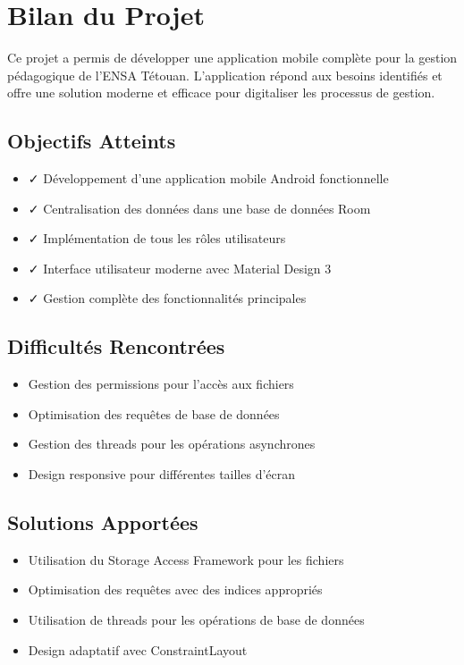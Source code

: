 \documentclass[12pt,a4paper]{report}
\begin{document}
\section{Bilan du Projet}

Ce projet a permis de développer une application mobile complète pour la gestion pédagogique de l'ENSA Tétouan. L'application répond aux besoins identifiés et offre une solution moderne et efficace pour digitaliser les processus de gestion.

\subsection{Objectifs Atteints}

\begin{itemize}
    \item ✓ Développement d'une application mobile Android fonctionnelle
    \item ✓ Centralisation des données dans une base de données Room
    \item ✓ Implémentation de tous les rôles utilisateurs
    \item ✓ Interface utilisateur moderne avec Material Design 3
    \item ✓ Gestion complète des fonctionnalités principales
\end{itemize}

\subsection{Difficultés Rencontrées}

\begin{itemize}
    \item Gestion des permissions pour l'accès aux fichiers
    \item Optimisation des requêtes de base de données
    \item Gestion des threads pour les opérations asynchrones
    \item Design responsive pour différentes tailles d'écran
\end{itemize}

\subsection{Solutions Apportées}

\begin{itemize}
    \item Utilisation du Storage Access Framework pour les fichiers
    \item Optimisation des requêtes avec des indices appropriés
    \item Utilisation de threads pour les opérations de base de données
    \item Design adaptatif avec ConstraintLayout
\end{itemize}
\end{document}
